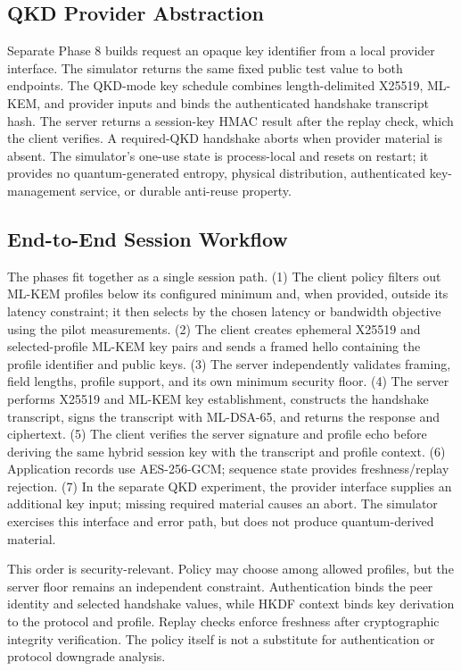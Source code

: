 \documentclass[journal]{IEEEtran}
\begin{document}
\subsection{QKD Provider Abstraction}
Separate Phase 8 builds request an opaque key identifier from a local provider interface. The simulator returns the same fixed public test value to both endpoints. The QKD-mode key schedule combines length-delimited X25519, ML-KEM, and provider inputs and binds the authenticated handshake transcript hash. The server returns a session-key HMAC result after the replay check, which the client verifies. A required-QKD handshake aborts when provider material is absent. The simulator's one-use state is process-local and resets on restart; it provides no quantum-generated entropy, physical distribution, authenticated key-management service, or durable anti-reuse property.

\subsection{End-to-End Session Workflow}
The phases fit together as a single session path. (1) The client policy filters out ML-KEM profiles below its configured minimum and, when provided, outside its latency constraint; it then selects by the chosen latency or bandwidth objective using the pilot measurements. (2) The client creates ephemeral X25519 and selected-profile ML-KEM key pairs and sends a framed hello containing the profile identifier and public keys. (3) The server independently validates framing, field lengths, profile support, and its own minimum security floor. (4) The server performs X25519 and ML-KEM key establishment, constructs the handshake transcript, signs the transcript with ML-DSA-65, and returns the response and ciphertext. (5) The client verifies the server signature and profile echo before deriving the same hybrid session key with the transcript and profile context. (6) Application records use AES-256-GCM; sequence state provides freshness/replay rejection. (7) In the separate QKD experiment, the provider interface supplies an additional key input; missing required material causes an abort. The simulator exercises this interface and error path, but does not produce quantum-derived material.

This order is security-relevant. Policy may choose among allowed profiles, but the server floor remains an independent constraint. Authentication binds the peer identity and selected handshake values, while HKDF context binds key derivation to the protocol and profile. Replay checks enforce freshness after cryptographic integrity verification. The policy itself is not a substitute for authentication or protocol downgrade analysis.
\end{document}
